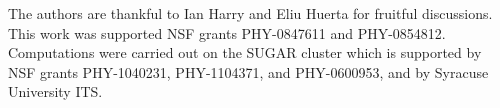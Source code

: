 \documentclass[aps,
prd,
amsmath,
amssymb,
twocolumn,
floatfix,
groupedaddress]{revtex4-1}
\begin{document}
%
%
%
\begin{acknowledgments}
The authors are thankful to Ian Harry and Eliu Huerta for fruitful discussions. This work was supported NSF grants PHY-0847611 and PHY-0854812. Computations were carried out on the SUGAR cluster which is supported by NSF grants PHY-1040231, PHY-1104371, and PHY-0600953, and by Syracuse University ITS.
\end{acknowledgments}


\end{document}
